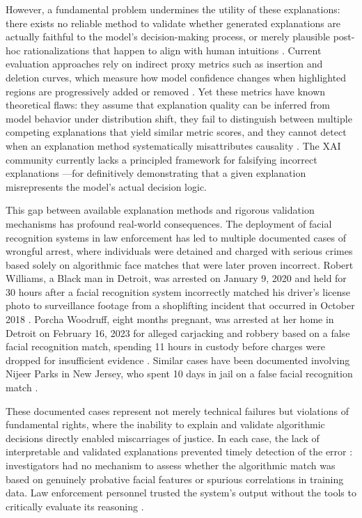 However, a fundamental problem undermines the utility of these explanations: there exists no reliable method to validate \cite{alvarezmelis2018robustness} whether generated explanations are actually faithful to the model's decision-making process, or merely plausible post-hoc rationalizations that happen to align with human intuitions \cite{rudin2019stop,leavy2020interpretation}. Current evaluation approaches rely on indirect proxy metrics such as insertion and deletion curves, which measure how model confidence changes when highlighted regions are progressively added or removed \cite{petsiuk2018rise,samek2016evaluating}. Yet these metrics have known theoretical flaws: they assume that explanation quality can be inferred from model behavior under distribution shift, they fail to distinguish between multiple competing explanations that yield similar metric scores, and they cannot detect when an explanation method systematically misattributes causality \cite{hooker2019benchmark,Adebayo2018_SanityChecks,tomsett2020sanity}. The XAI community currently lacks a principled framework for falsifying incorrect explanations \cite{Samek2021_XAI_Review,Linardatos2021_XAI_Interpretability,nauta2023quantitative}---for definitively demonstrating that a given explanation misrepresents the model's actual decision logic.

This gap between available explanation methods and rigorous validation mechanisms has profound real-world consequences. The deployment of facial recognition systems in law enforcement has led to multiple documented cases of wrongful arrest, where individuals were detained and charged with serious crimes based solely on algorithmic face matches that were later proven incorrect. Robert Williams, a Black man in Detroit, was arrested on January 9, 2020 and held for 30 hours after a facial recognition system incorrectly matched his driver's license photo to surveillance footage from a shoplifting incident that occurred in October 2018 \cite{hill2020detroit}. Porcha Woodruff, eight months pregnant, was arrested at her home in Detroit on February 16, 2023 for alleged carjacking and robbery based on a false facial recognition match, spending 11 hours in custody before charges were dropped for insufficient evidence \cite{hill2023pregnant}. Similar cases have been documented involving Nijeer Parks in New Jersey, who spent 10 days in jail on a false facial recognition match \cite{parks2019wrongful}.

These documented cases \cite{parks2019wrongful,hill2020detroit,hill2023pregnant} represent not merely technical failures but violations of fundamental rights, where the inability to explain and validate algorithmic decisions directly enabled miscarriages of justice. In each case, the lack of interpretable and validated explanations prevented timely detection of the error \cite{nrc2009strengthening,Leslie2020_BiasFaceRecognition}: investigators had no mechanism to assess whether the algorithmic match was based on genuinely probative facial features or spurious correlations in training data. Law enforcement personnel trusted the system's output without the tools to critically evaluate its reasoning \cite{garvie2016perpetual}.

